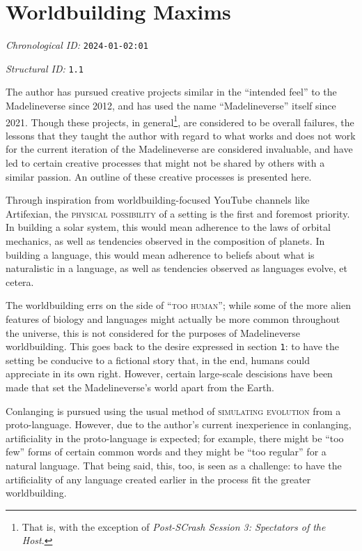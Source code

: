 \section{Worldbuilding Maxims}
\emph{Chronological ID:} \texttt{2024-01-02:01}

\emph{Structural ID:} \texttt{1.1}

The author has pursued creative projects similar in the ``intended feel'' to the Madelineverse since 2012, and has used the name ``Madelineverse'' itself since 2021. Though these projects, in general\footnote{That is, with the exception of \emph{Post-SCrash Session 3: Spectators of the Host}.}, are considered to be overall failures, the lessons that they taught the author with regard to what works and does not work for the current iteration of the Madelineverse are considered invaluable, and have led to certain creative processes that might not be shared by others with a similar passion. An outline of these creative processes is presented here.

Through inspiration from worldbuilding-focused YouTube channels like Artifexian, the \textsc{physical possibility} of a setting is the first and foremost priority. In building a solar system, this would mean adherence to the laws of orbital mechanics, as well as tendencies observed in the composition of planets. In building a language, this would mean adherence to beliefs about what is naturalistic in a language, as well as tendencies observed as languages evolve, et cetera.

The worldbuilding errs on the side of ``\textsc{too human}''; while some of the more alien features of biology and languages might actually be more common throughout the universe, this is not considered for the purposes of Madelineverse worldbuilding. This goes back to the desire expressed in section \texttt{1}: to have the setting be conducive to a fictional story that, in the end, humans could appreciate in its own right. However, certain large-scale descisions have been made that set the Madelineverse's world apart from the Earth.

Conlanging is pursued using the usual method of \textsc{simulating evolution} from a proto-language. However, due to the author's current inexperience in conlanging, artificiality in the proto-language is expected; for example, there might be ``too few'' forms of certain common words and they might be ``too regular'' for a natural language. That being said, this, too, is seen as a challenge: to have the artificiality of any language created earlier in the process fit the greater worldbuilding.
\newpage
